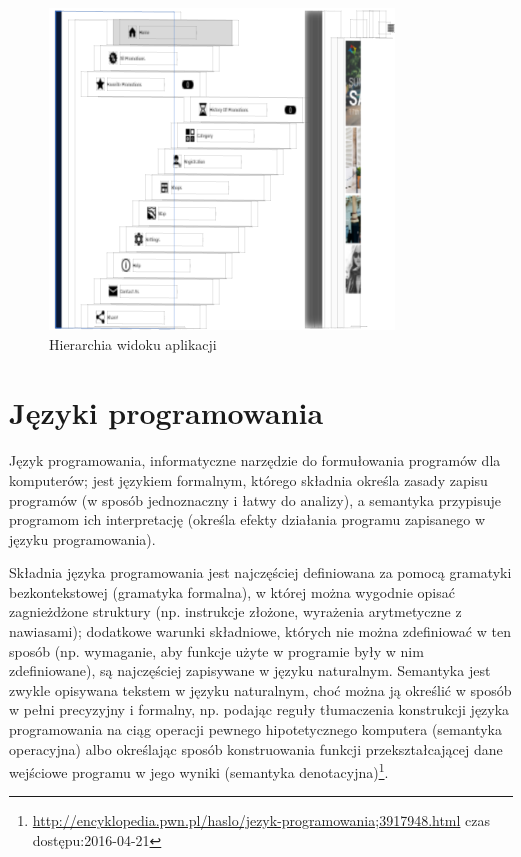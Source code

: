 \documentclass{iiuwb}
\begin{document}
 \begin{figure}[!th]
\centering
\includegraphics[scale=.5]{image/XcodeViewHierarchy.png}
\caption{Hierarchia widoku aplikacji}
\label{fig:XcodeViewHierarchy}
\end{figure}
\section{Języki programowania}
Język programowania, informatyczne narzędzie do formułowania programów dla komputerów; jest językiem formalnym, którego składnia określa zasady zapisu programów (w sposób jednoznaczny i łatwy do analizy), a semantyka przypisuje programom ich interpretację (określa efekty działania programu zapisanego w języku programowania).

Składnia języka programowania jest najczęściej definiowana za pomocą gramatyki bezkontekstowej (gramatyka formalna), w której można wygodnie opisać zagnieżdżone struktury (np. instrukcje złożone, wyrażenia arytmetyczne z nawiasami); dodatkowe warunki składniowe, których nie można zdefiniować w ten sposób (np. wymaganie, aby funkcje użyte w programie były w nim zdefiniowane), są najczęściej zapisywane w języku naturalnym. Semantyka jest zwykle opisywana tekstem w języku naturalnym, choć można ją określić w sposób w pełni precyzyjny i formalny, np. podając reguły tłumaczenia konstrukcji języka programowania na ciąg operacji pewnego hipotetycznego komputera (semantyka operacyjna) albo określając sposób konstruowania funkcji przekształcającej dane wejściowe programu w jego wyniki (semantyka denotacyjna)\footnote{\url{http://encyklopedia.pwn.pl/haslo/jezyk-programowania;3917948.html} czas dostępu:2016-04-21}. 
\end{document}
